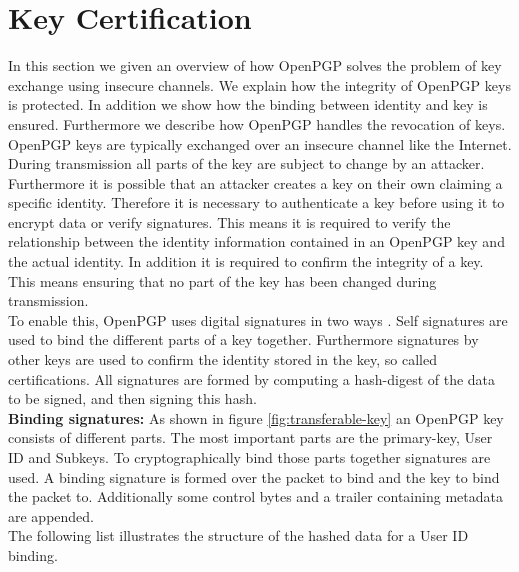 \section{Key Certification}
\label{section:messageformat:cert}

In this section we given an overview of how OpenPGP solves the problem of key exchange using insecure channels. We explain how the integrity of OpenPGP keys is protected. In addition we show how the binding between identity and key is ensured. Furthermore we describe how OpenPGP handles the revocation of keys. \\

OpenPGP keys are typically exchanged over an insecure channel like the Internet. During transmission all parts of the key are subject to change by an attacker. Furthermore it is possible that an attacker creates a key on their own claiming a specific identity. Therefore it is necessary to authenticate a key before using it to encrypt data or verify signatures.
This means it is required to verify the relationship between the identity information contained in an OpenPGP key and the actual identity. In addition it is required to confirm the integrity of a key. This means ensuring that no part of the key has been changed during transmission. \\

To enable this, OpenPGP uses digital signatures in two ways \cite[section 5.2.4]{RFC4880}. Self signatures are used to bind the different parts of a key together. Furthermore signatures by other keys are used to confirm the identity stored in the key, so called certifications. All signatures are formed by computing a hash-digest of the data to be signed, and then signing this hash. \\

\textbf{Binding signatures:} As shown in figure \ref{fig:transferable-key} an OpenPGP key consists of different parts. The most important parts are the primary-key, User ID  and Subkeys. To cryptographically bind those parts together signatures are used. A binding signature is formed over the packet to bind and the key to bind the packet to. Additionally some control bytes and a trailer containing metadata are appended.  \\

The following list illustrates the structure of the hashed data for a User ID binding.

